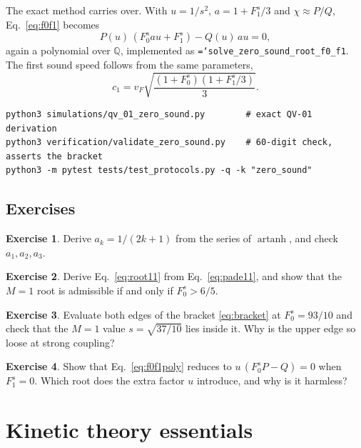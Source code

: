 \documentclass[11pt,a4paper,openany]{book}
\newcommand{\Fzs}{F_0^{s}}
\newcommand{\Fos}{F_1^{s}}
\newcommand{\code}[1]{\texttt{\hyphenchar\font=`\-\relax #1}}
\newcommand{\Q}{\mathbb{Q}}
\theoremstyle{definition}
\newtheorem{exercise}{Exercise}[chapter]
\theoremstyle{plain}
\begin{document}
The exact method carries over. With $u=1/s^2$, $a=1+\Fos/3$ and $\chi\approx P/Q$,
Eq.~\eqref{eq:f0f1} becomes
\begin{equation}
  P(u)\,(\Fzs au+\Fos)-Q(u)\,au=0,
  \label{eq:f0f1poly}
\end{equation}
again a polynomial over $\Q$, implemented as \code{solve\_zero\_sound\_root\_f0\_f1}. The first
sound speed follows from the same parameters,
\begin{equation}
  c_1=v_F\sqrt{\frac{(1+\Fzs)(1+\Fos/3)}{3}}.
  \label{eq:c1}
\end{equation}

\begin{runit}
\begin{verbatim}
python3 simulations/qv_01_zero_sound.py        # exact QV-01 derivation
python3 verification/validate_zero_sound.py    # 60-digit check, asserts the bracket
python3 -m pytest tests/test_protocols.py -q -k "zero_sound"
\end{verbatim}
\end{runit}

\section*{Exercises}
\begin{exercise}\label{ex:ak}
Derive $a_k=1/(2k+1)$ from the series of $\operatorname{artanh}$, and check $a_1,a_2,a_3$.
\end{exercise}
\begin{exercise}\label{ex:root11}
Derive Eq.~\eqref{eq:root11} from Eq.~\eqref{eq:pade11}, and show that the $M=1$ root is
admissible if and only if $\Fzs>6/5$.
\end{exercise}
\begin{exercise}\label{ex:bracket93}
Evaluate both edges of the bracket \eqref{eq:bracket} at $\Fzs=93/10$ and check that the $M=1$
value $s=\sqrt{37/10}$ lies inside it. Why is the upper edge so loose at strong coupling?
\end{exercise}
\begin{exercise}\label{ex:f1zero}
Show that Eq.~\eqref{eq:f0f1poly} reduces to $u\,(\Fzs P-Q)=0$ when $\Fos=0$. Which root does
the extra factor $u$ introduce, and why is it harmless?
\end{exercise}

\chapter{Kinetic theory essentials}
\label{ch:kinetic}
\end{document}

